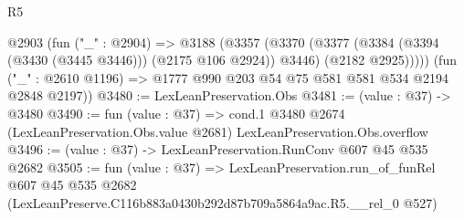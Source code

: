 \begin{lexlean}{R5}
\begin{coremodule}
      @2903
        (fun ("_" : @2904) =>
        @3188
          (@3357
            (@3370
              (@3377 (@3384 (@3394 (@3430 (@3445 @3446))) (@2175 @106 @2924)) @3446)
              (@2182 @2925)))))
      (fun ("_" : @2610 @1196) => @1777 @990 @203 @54 @75 @581 @581 @534 @2194 @2848 @2197))
@3480 := LexLeanPreservation.Obs
@3481 := (value : @37) -> @3480
@3490 := fun (value : @37) =>
  cond.{1} @3480 @2674 (LexLeanPreservation.Obs.value @2681) LexLeanPreservation.Obs.overflow
@3496 := (value : @37) -> LexLeanPreservation.RunConv @607 @45 @535 @2682
@3505 := fun (value : @37) =>
  LexLeanPreservation.run_of_funRel
    @607
    @45
    @535
    @2682
    (LexLeanPreserve.C116b883a0430b292d87b709a5864a9ac.R5.__rel_0 @527)
\end{coremodule}
\end{lexlean}
